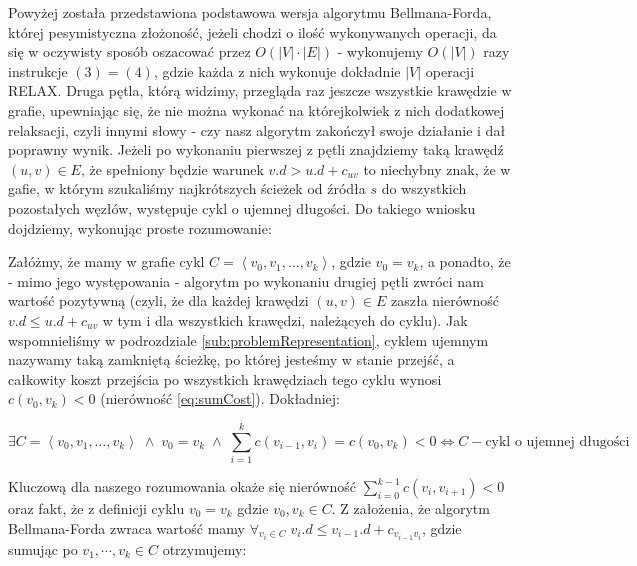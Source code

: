 Powyżej została przedstawiona podstawowa wersja algorytmu Bellmana-Forda, której pesymistyczna złożoność, jeżeli chodzi o ilość wykonywanych operacji, da się w oczywisty sposób oszacować przez $ O \left( \left| V \right| \cdot \left| E \right| \right) $ - wykonujemy $ O \left( \left| V \right| \right) $ razy instrukcje $ \left( 3 \right) = \left( 4 \right) $, gdzie każda z nich wykonuje dokładnie $ \left| V \right| $ operacji \textsf{RELAX}. Druga pętla, którą widzimy, przegląda raz jeszcze wszystkie krawędzie w grafie, upewniając się, że nie można wykonać na którejkolwiek z nich dodatkowej relaksacji, czyli innymi słowy - czy nasz algorytm zakończył swoje działanie i dał poprawny wynik. Jeżeli po wykonaniu pierwszej z pętli znajdziemy taką krawędź $ \left( u, v \right) \in E $, że spełniony będzie warunek $ v.d > u.d + c_{uv}$ to niechybny znak, że w gafie, w którym szukaliśmy najkrótszych ścieżek od źródła $s$ do wszystkich pozostałych węzłów, występuje cykl o ujemnej długości. Do takiego wniosku dojdziemy, wykonując proste rozumowanie:

Załóżmy, że mamy w grafie cykl $C = \left \langle v_{0}, v_{1}, \ldots, v_{k} \right \rangle $, gdzie $ v_{0} = v_{k}$, a ponadto, że - mimo jego występowania - algorytm po wykonaniu drugiej pętli zwróci nam wartość pozytywną \textsf{\KwTrue} (czyli, że dla każdej krawędzi $ \left( u, v \right) \in E $ zaszła nierówność $ v.d \leqslant u.d + c_{uv}$ w tym i dla wszystkich krawędzi, należących do cyklu). Jak wspomnieliśmy w podrozdziale \ref{sub:problemRepresentation}, cyklem ujemnym nazywamy taką zamkniętą ścieżkę, po której jesteśmy w stanie przejść, a całkowity koszt przejścia po wszystkich krawędziach tego cyklu wynosi $ c \left( v_{0}, v_{k} \right) < 0 $ (nierówność \ref{eq:sumCost}). Dokładniej:

\begin{equation}
\exists C = \left \langle v_{0}, v_{1}, \ldots, v_{k} \right \rangle \; \wedge \; v_{0} = v_{k} \; \wedge \; \sum _{i=1}^{k} c \left( v_{i-1}, v_{i} \right ) = c \left( v_{0} , v_{k} \right) < 0 \Leftrightarrow C - \textrm{cykl o ujemnej długości}
\end{equation}

Kluczową dla naszego rozumowania okaże się nierówność $\sum _{i=0}^{k-1} c \left( v_{i}, v_{i+1} \right ) < 0$ oraz fakt, że z definicji cyklu $v_{0} = v_{k}$ gdzie $v_{0}, v_{k} \in C$. Z założenia, że algorytm Bellmana-Forda zwraca wartość \textsf{\KwTrue} mamy $\forall_{v_{i} \in C} \; v_{i}.d \leqslant v_{i-1}.d + c_{v_{i-1}v_{i}}$, gdzie sumując po $v_{1}, \cdots, v_{k} \in C$ otrzymujemy:

